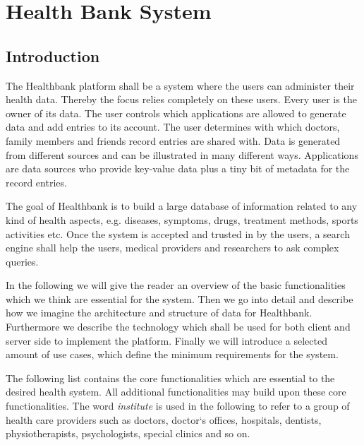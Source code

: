 \chapter{Health Bank System} 
\label{chap:generaldesign}
 

\section{Introduction} 

The Healthbank platform shall be a system where the users can administer their health data. Thereby the focus relies completely on these users. Every user is the owner of its data. 
The user controls which applications are allowed to generate data and add entries to its account. The user determines with which doctors, family members and friends record entries are shared with.
Data is generated from different sources and can be illustrated in many different ways. Applications are data sources who provide key-value data plus a tiny bit of metadata for the record entries.

The goal of Healthbank is to build a large database of information related to any kind of health aspects, e.g. diseases, symptoms, drugs, treatment methods, sports activities etc. Once the system is accepted and trusted in by the users, a search engine shall help the users, medical providers and researchers to ask complex queries.  

In the following we will give the reader an overview of the basic functionalities which we think are essential for the system. Then we go into detail and describe how we imagine the architecture and structure of data for Healthbank. Furthermore we describe the technology which shall be used for both client and server side to implement the platform. Finally we will introduce a selected amount of use cases, which define the minimum requirements for the system. \newline

The following list contains the core functionalities which are essential to the desired health system. All additional functionalities may build upon these core functionalities. The word \emph{institute} is used in the following to refer to a group of health care providers such as doctors, doctor`s offices, hospitals, dentists, physiotherapists, psychologists, special clinics and so on. 


